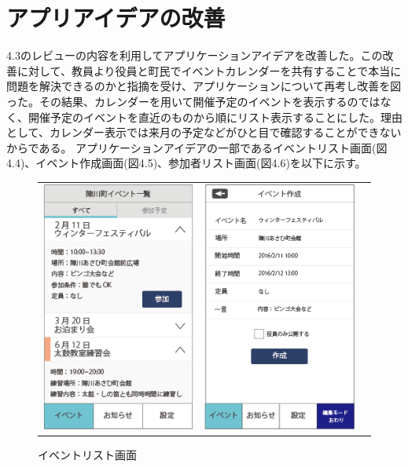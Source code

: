 \section{アプリアイデアの改善}
4.3のレビューの内容を利用してアプリケーションアイデアを改善した。この改善に対して、教員より役員と町民でイベントカレンダーを共有することで本当に問題を解決できるのかと指摘を受け、アプリケーションについて再考し改善を図った。その結果、カレンダーを用いて開催予定のイベントを表示するのではなく、開催予定のイベントを直近のものから順にリスト表示することにした。理由として、カレンダー表示では来月の予定などがひと目で確認することができないからである。
アプリケーションアイデアの一部であるイベントリスト画面(図4.4)、イベント作成画面(図4.5)、参加者リスト画面(図4.6)を以下に示す。
\newpage%
\begin{figure}[h]
    \begin{tabular}{ccc}
      \begin{minipage}[t]{0.3\hsize}
        \centering
        \includegraphics[keepaspectratio, scale=0.5]{process_figures/eventlist.png}
        \caption{イベントリスト画面}
        \label{calender}
      \end{minipage} &
      \begin{minipage}[t]{0.3\hsize}
        \centering
        \includegraphics[keepaspectratio, scale=0.5]{process_figures/new_create_event.png}

\end{minipage}
\end{tabular}
\end{figure}
